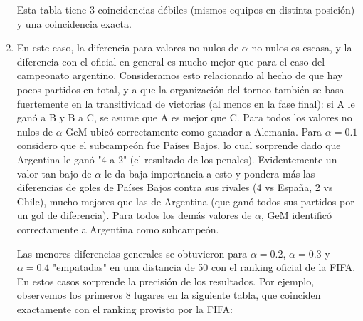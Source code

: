 \begin{enumerate}
        \par Esta tabla tiene 3 coincidencias débiles (mismos equipos en
        distinta posición) y una coincidencia exacta.\\

    \item En este caso, la diferencia para valores no nulos de $\alpha$ no nulos
        es escasa, y la diferencia con el oficial en general es mucho mejor que
        para el caso del campeonato argentino. Consideramos esto relacionado al
        hecho de que hay pocos partidos en total, y a que la organización del
        torneo también se basa fuertemente en la transitividad de victorias (al
        menos en la fase final): si A le ganó a B y B a C, se asume que A es
        mejor que C.  Para todos los valores no nulos de $\alpha$ GeM ubicó
        correctamente como ganador a Alemania. Para $\alpha=0.1$ considero que
        el subcampeón fue Países Bajos, lo cual sorprende dado que Argentina le
        ganó "4 a 2" (el resultado de los penales). Evidentemente un valor tan
        bajo de $\alpha$ le da baja importancia a esto y pondera más las
        diferencias de goles de Países Bajos contra sus rivales (4 vs España, 2
        vs Chile), mucho mejores que las de Argentina (que ganó todos sus
        partidos por un gol de diferencia). Para todos los demás valores de
        $\alpha$, GeM identificó correctamente a Argentina como subcampeón.

        \par Las menores diferencias generales se obtuvieron para $\alpha=0.2$,
        $\alpha=0.3$ y $\alpha=0.4$ "empatadas" en una distancia de 50 con el
        ranking oficial de la FIFA. En estos casos sorprende la precisión de los
        resultados. Por ejemplo, observemos los primeros 8 lugares en la
        siguiente tabla, que coinciden exactamente con el ranking provisto por
        la FIFA:


\end{enumerate}
